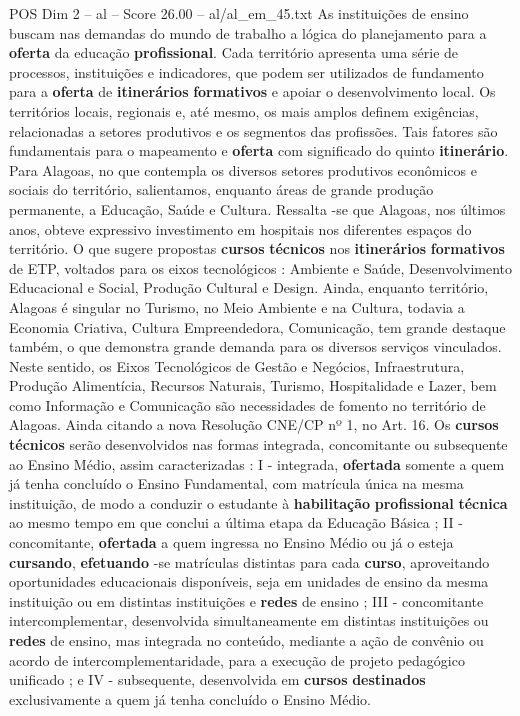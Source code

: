 \begin{textsample}{POS Dim 2 – al – Score 26.00 – al/al\_em\_45.txt}
As instituições de ensino buscam nas demandas do mundo de trabalho a lógica do planejamento para a \textbf{oferta} da educação \textbf{profissional}.
Cada território apresenta uma série de processos, instituições e indicadores, que podem ser utilizados de fundamento para a \textbf{oferta} de \textbf{itinerários} \textbf{formativos} e apoiar o desenvolvimento local.
Os territórios locais, regionais e, até mesmo, os mais amplos definem exigências, relacionadas a setores produtivos e os segmentos das profissões.
Tais fatores são fundamentais para o mapeamento e \textbf{oferta} com significado do quinto \textbf{itinerário}.
Para Alagoas, no que contempla os diversos setores produtivos econômicos e sociais do território, salientamos, enquanto áreas de grande produção permanente, a Educação, Saúde e Cultura.
Ressalta -se que Alagoas, nos últimos anos, obteve expressivo investimento em hospitais nos diferentes espaços do território.
O que sugere propostas \textbf{cursos} \textbf{técnicos} nos \textbf{itinerários} \textbf{formativos} de ETP, voltados para os eixos tecnológicos : Ambiente e Saúde, Desenvolvimento Educacional e Social, Produção Cultural e Design.
Ainda, enquanto território, Alagoas é singular no Turismo, no Meio Ambiente e na Cultura, todavia a Economia Criativa, Cultura Empreendedora, Comunicação, tem grande destaque também, o que demonstra grande demanda para os diversos serviços vinculados.
Neste sentido, os Eixos Tecnológicos de Gestão e Negócios, Infraestrutura, Produção Alimentícia, Recursos Naturais, Turismo, Hospitalidade e Lazer, bem como Informação e Comunicação são necessidades de fomento no território de Alagoas.
Ainda citando a nova Resolução CNE/CP nº 1, no Art. 16.
Os \textbf{cursos} \textbf{técnicos} serão desenvolvidos nas formas integrada, concomitante ou subsequente ao Ensino Médio, assim caracterizadas : I - integrada, \textbf{ofertada} somente a quem já tenha concluído o Ensino Fundamental, com matrícula única na mesma instituição, de modo a conduzir o estudante à \textbf{habilitação} \textbf{profissional} \textbf{técnica} ao mesmo tempo em que conclui a última etapa da Educação Básica ; II - concomitante, \textbf{ofertada} a quem ingressa no Ensino Médio ou já o esteja \textbf{cursando}, \textbf{efetuando} -se matrículas distintas para cada \textbf{curso}, aproveitando oportunidades educacionais disponíveis, seja em unidades de ensino da mesma instituição ou em distintas instituições e \textbf{redes} de ensino ; III - concomitante intercomplementar, desenvolvida simultaneamente em distintas instituições ou \textbf{redes} de ensino, mas integrada no conteúdo, mediante a ação de convênio ou acordo de intercomplementaridade, para a execução de projeto pedagógico unificado ; e IV - subsequente, desenvolvida em \textbf{cursos} \textbf{destinados} exclusivamente a quem já tenha concluído o Ensino Médio.

\end{textsample}
